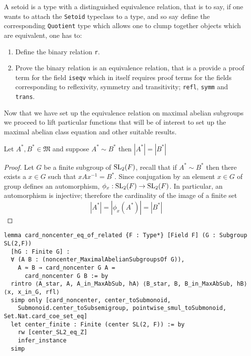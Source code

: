 \begin{remark}
  A setoid is a type with a distinguished equivalence relation, that is to say, if one wants to attach the \texttt{Setoid} 
  typeclass to a type, and so say define the corresponding \texttt{Quotient} type which allows one to clump together objects which are equivalent, one has to:
  \begin{enumerate}
    \item Define the binary relation \texttt{r}.
    \item Prove the binary relation is an equivalence relation, that is a provide a proof term
     for the field \texttt{iseqv} which in itself requires proof terms for the fields corresponding to 
     reflexivity, symmetry and transitivity; \texttt{refl}, \texttt{symm} and \texttt{trans}.
  \end{enumerate} 
\end{remark}


Now that we have set up the equivalence relation on maximal abelian subgroups we proceed to lift particular functions that will be of interest to set up the maximal abelian class equation and 
other suitable results.

\begin{lemma}
  \label{card_noncenter_eq_of_related}
  \leanok
  Let $A^*, B^* \in \mathfrak{M}$ and suppose $A^* \sim B^*$ then $|A^*| = |B^*|$
\end{lemma}
\begin{proof}
  \leanok
  Let $G$ be a finite subgroup of $\operatorname{SL}_2(F)$, recall that if $A^* \sim B^*$ then there exists a $x \in G$ such that $x A x^{-1} = B^*$.
  Since conjugation by an element $x \in G$ of group defines an automorphism, $\phi_x : \operatorname{SL}_2(F) \rightarrow \operatorname{SL}_2(F)$. In particular, an automorphism is injective; 
  therefore the cardinality of the image of a finite set
  \[
  |A^*| = |\phi_x(A^*)| = |B^*|
  \]
\end{proof}
\begin{footnotesize}
\begin{verbatim}
lemma card_noncenter_eq_of_related {F : Type*} [Field F] (G : Subgroup SL(2,F))
  [hG : Finite G] :
  ∀ (A B : (noncenter_MaximalAbelianSubgroupsOf G)),
    A ≈ B → card_noncenter G A =
      card_noncenter G B := by
  rintro ⟨A_star, A, A_in_MaxAbSub, hA⟩ ⟨B_star, B, B_in_MaxAbSub, hB⟩ ⟨x, x_in_G, rfl⟩
  simp only [card_noncenter, center_toSubmonoid,
    Submonoid.center_toSubsemigroup, pointwise_smul_toSubmonoid, Set.Nat.card_coe_set_eq]
  let center_finite : Finite (center SL(2, F)) := by
    rw [center_SL2_eq_Z]
    infer_instance
  simp
\end{verbatim}
\end{footnotesize}

